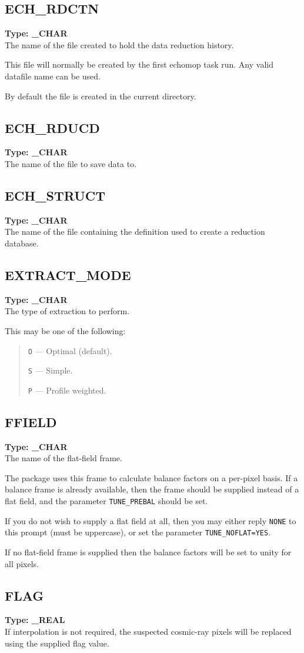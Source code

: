 \documentclass[11pt,twoside]{article}
\makeatletter
\newcommand{\stardocinitials}  {SUN}
\newcommand{\stardocnumber}    {152.4}
\newcommand{\stardocname}{\stardocinitials /\stardocnumber}
\newcommand{\htmlref}[2]{#1}
\newcommand{\xlabel}[1]{}
\newcommand{\indexcmdname}[1]{\index{#1@\protect\cmdname{#1}}}
\renewcommand{\indexcmdname}[1]{}
\newcommand{\cmdname}{\begingroup \catcode`\_=12 \realcmdname}
\newcommand{\realcmdname}[1]{\endgroup\texttt{#1}}
\newcommand{\echparameter}[4]
{
\item [#1 = #3] \mbox{}\label{par_#2}\indexcmdname{#2}
\\
#4
}
\renewcommand{\echparameter}[4]
{
  \subsection{\xlabel{par_#2}\label{par_#2}{\bf #1}}
  {\bf Type: #3}\\
#4
}
\makeatother
\begin{document}
\echparameter{ECH\_RDCTN}{ECH_RDCTN}{
 \_CHAR
}{
 The name of the file created to hold the data reduction history.

 This file will normally be created by the first {\sc echomop} task run.
 Any valid datafile name can be used.

 By default the file is created in the current directory.
}

\echparameter{ECH\_RDUCD}{ECH_RDUCD}{
 \_CHAR
}{
 The name of the file to save data to.
}

\echparameter{ECH\_STRUCT}{ECH_STRUCT}{
 \_CHAR
}{
 The name of the file containing the definition used to create a
 reduction database.
}

\echparameter{EXTRACT\_MODE}{EXTRACT_MODE}{
 \_CHAR
}{
 The type of extraction to perform.

 This may be one of the following:

 \begin{quote}
    {\tt O} --- Optimal (default).

    {\tt S} --- Simple.

    {\tt P} --- Profile weighted.
 \end{quote}
}

\markboth{PARAMETERS: F}{\stardocname}
\echparameter{FFIELD}{FFIELD}{
 \_CHAR
}{
 The name of the flat-field frame.

 The package uses this frame to calculate balance factors on a
 per-pixel basis.  If a balance frame is already available, then the
 frame should be supplied instead of a flat field, and the parameter
 \htmlref{{\tt TUNE\_PREBAL}}{par_TUNE_PREBAL} should be set.

 If you do not wish to supply a flat field at all, then you may
 either reply \texttt{NONE} to this prompt (must be uppercase), or
 set the parameter \htmlref{{\tt TUNE\_NOFLAT=YES}}{par_TUNE_NOFLAT}\@.

 If no flat-field frame is supplied then the balance factors will be
 set to unity for all pixels.
}

\echparameter{FLAG}{FLAG}{
 \_REAL
}{
 If interpolation is not required, the suspected cosmic-ray pixels
 will be replaced using the supplied flag value.
}
\end{document}
